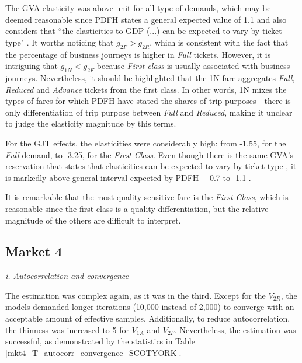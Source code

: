 The GVA elasticity was above unit for all type of demands, which may be deemed reasonable since PDFH states a general expected value of 1.1 \citep[p.~9, Chapter B1]{pdfhv5} and also considers that ``the elasticities to GDP (...) can be expected to vary by ticket type" \citep[p.~7, Chapter B2]{pdfh}. It worths noticing that $g_{2F} > g_{2R}$, which is consistent with the fact that the percentage of business journeys is higher in \textit{Full} tickets. However, it is intriguing that $g_{1N} < g_{2F}$ because \textit{First class} is usually associated with business journeys. Nevertheless, it should be highlighted that the 1N fare aggregates \textit{Full}, \textit{Reduced} and \textit{Advance} tickets from the first class. In other words, 1N mixes the types of fares for which PDFH have stated the shares of trip purposes - there is only differentiation of trip purpose between \textit{Full} and \textit{Reduced}, making it unclear to judge the elasticity magnitude by this terms.

For the GJT effects, the elasticities were considerably high:  from -1.55, for the \textit{Full} demand, to -3.25, for the \textit{First Class}. Even though there is the same GVA's reservation that states that elasticities can be expected to vary by ticket type \citep{pdfh}, it is markedly above general interval expected by PDFH - -0.7 to -1.1 \citep{pdfhv5}. 

It is remarkable that the most quality sensitive fare is the \textit{First Class}, which is reasonable since the first class is a quality differentiation, but the relative magnitude of the others are difficult to interpret.


\subsection{Market 4}

\textit{i. Autocorrelation and convergence}

The estimation was complex again, as it was in the third. Except for the $V_{2R}$, the models demanded longer iterations (10,000 instead of 2,000) to converge with an acceptable amount of effective samples. Additionally, to reduce autocorrelation, the thinness was increased to 5 for $V_{1A}$ and $V_{2F}$. Nevertheless, the estimation was successful, as demonstrated by the statistics in Table \ref{mkt4_T_autocorr_convergence_SCOTYORK}.

